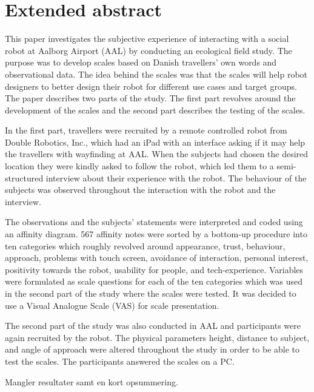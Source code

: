 

\chapter{Extended abstract}
\label{Abstract}
This paper investigates the subjective experience of interacting with a social robot at Aalborg Airport (AAL) by conducting an ecological field study. The purpose was to develop scales based on Danish travellers' own words and observational data. The idea behind the scales was that the scales will help robot designers to better design their robot for different use cases and target groups. The paper describes two parts of the study. The first part revolves around the development of the scales and the second part describes the testing of the scales.

In the first part, travellers were recruited by a remote controlled robot from Double Robotics, Inc., which had an iPad with an interface asking if it may help the travellers with wayfinding at AAL. When the subjects had chosen the desired location they were kindly asked to follow the robot, which led them to a semi-structured interview about their experience with the robot. The behaviour of the subjects was observed throughout the interaction with the robot and the interview. 

The observations and the subjects' statements were interpreted and coded using an affinity diagram. 567 affinity notes were sorted by a bottom-up procedure into ten categories which roughly revolved around appearance, trust, behaviour, approach, problems with touch screen, avoidance of interaction, personal interest, positivity towards the robot, usability for people, and tech-experience.  Variables were formulated as scale questions for each of the ten categories which was used in the second part of the study where the scales were tested. It was decided to use a Visual Analogue Scale (VAS) for scale presentation.

The second part of the study was also conducted in AAL and participants were again recruited by the robot. The physical parameters height, distance to subject, and angle of approach were altered throughout the study in order to be able to test the scales. The participants answered the scales on a PC. 

{\color{red} Mangler resultater samt en kort opsummering.}

